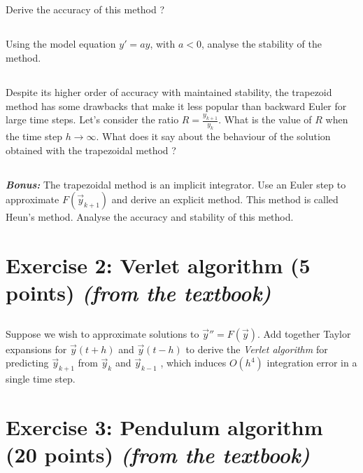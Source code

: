 \subsection{} Derive the accuracy of this method ?

\subsection{} Using the model equation $y' = ay$, with $a < 0$, analyse the stability of the method.

\subsection{} Despite its higher order of accuracy with maintained stability, the trapezoid method has some drawbacks that make it less popular than backward Euler for large time steps. Let's consider the ratio $R = \frac{y_{k+1}}{y_k}$. What is the value of $R$ when the time step $h \to \infty$. What does it say about the behaviour of the solution obtained with the trapezoidal method ?

\subsection{} \emph{\textbf{Bonus:}} The trapezoidal method is an implicit integrator. Use an Euler step to approximate $F(\vec{y}_{k+1})$ and derive an explicit method. This method is called Heun's method. Analyse the accuracy and stability of this method.

\section*{Exercise 2: Verlet algorithm \normalsize \textnormal(5 points) \textit{(from the textbook)}}

\subsection{} Suppose we wish to approximate solutions to $\vec{y}'' = F(\vec{y})$. Add together Taylor expansions for $\vec{y}(t + h)$ and $\vec{y}(t - h)$ to derive the \emph{Verlet algorithm} for predicting $\vec{y}_{k+1}$ from $\vec{y}_k$  and $\vec{y}_{k-1}$ , which induces $O(h^4)$ integration error in a single time step.


\section*{Exercise 3: Pendulum algorithm \normalsize \textnormal(20 points) \textit{(from the textbook)}}

